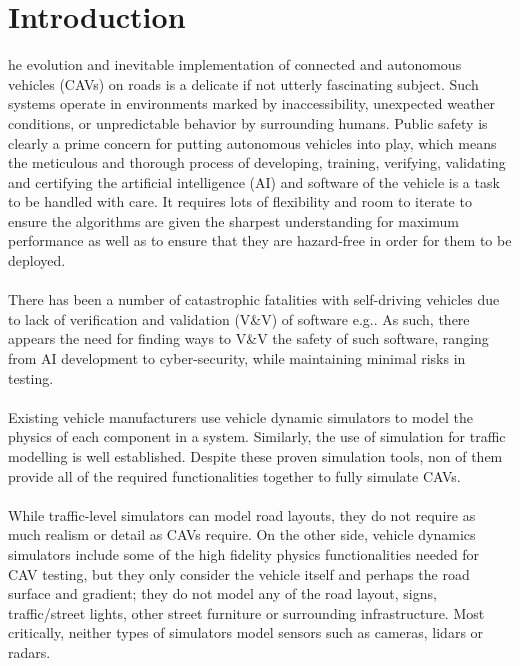 \section{Introduction}
\noindent {}he evolution and inevitable implementation of connected and autonomous vehicles (CAVs) on roads is a delicate if not utterly fascinating subject.
Such systems operate in environments marked by inaccessibility, unexpected weather conditions, or unpredictable behavior by surrounding humans\cite{RobustnessAutonomy}. 
Public safety is clearly a prime concern for putting autonomous vehicles into play, which means the meticulous and thorough process of developing, training, verifying, validating and certifying the artificial intelligence (AI) and software of the vehicle is a task to be handled with care. 
It requires lots of flexibility and room to iterate to ensure the algorithms are given the sharpest understanding for maximum performance as well as to ensure that they are hazard-free in order for them to be deployed\cite{AirsimUnrealArticle}.\\\\
\noindent There has been a number of catastrophic fatalities with self-driving vehicles due to lack of verification and validation (V\&V) of software e.g.\cite{FatalityExample}.
As such, there appears the need for finding ways to V\&V the safety of such software, ranging from AI development to cyber-security, while maintaining minimal risks in testing.\\\\
\noindent Existing vehicle manufacturers use vehicle dynamic simulators to model the physics of each component in a system. 
Similarly, the use of simulation for traffic modelling is well established. 
Despite these proven simulation tools, non of them provide all of the required functionalities together to fully simulate CAVs\cite{FrameworkAndChallenges}.\\\\
While traffic-level simulators can model road layouts, they do not require as much realism or detail as CAVs require. On the other side, vehicle dynamics simulators include some of the high fidelity physics functionalities needed for CAV testing, but they only consider the vehicle itself and perhaps the road surface and gradient; they do not model any of the road layout, signs, traffic/street lights, other street furniture or surrounding infrastructure. 
Most critically, neither types of simulators model sensors such as cameras, lidars or radars\cite{FrameworkAndChallenges}.\\\\ 
